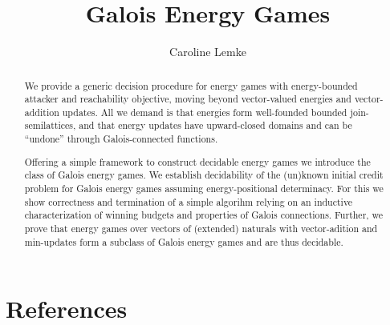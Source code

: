 \documentclass[11pt,a4paper]{article}
\begin{document}
\title{Galois Energy Games}
\author{Caroline Lemke}
\maketitle

\begin{abstract}
\noindent
We provide a generic decision procedure for energy games with energy-bounded attacker and reachability objective, 
moving beyond vector-valued energies and vector-addition updates. All we demand is that energies form well-founded bounded join-semilattices, 
and that energy updates have upward-closed domains and can be “undone” through Galois-connected functions. 

Offering a simple framework to construct decidable energy games we introduce the class of Galois energy games. 
We establish decidability of the (un)known initial credit problem for Galois energy games assuming energy-positional determinacy.
For this we show correctness and termination of a simple algorihm relying on an inductive characterization of winning budgets and properties of Galois connections. 
Further, we prove that energy games over vectors of (extended) naturals with vector-adition and min-updates form a subclass of Galois energy games and are thus decidable. 
\end{abstract}


\tableofcontents


\newpage

\newpage

\newpage

\newpage

\newpage

\newpage


\newpage
\section{References}



\newpage
\appendix

\end{document}
